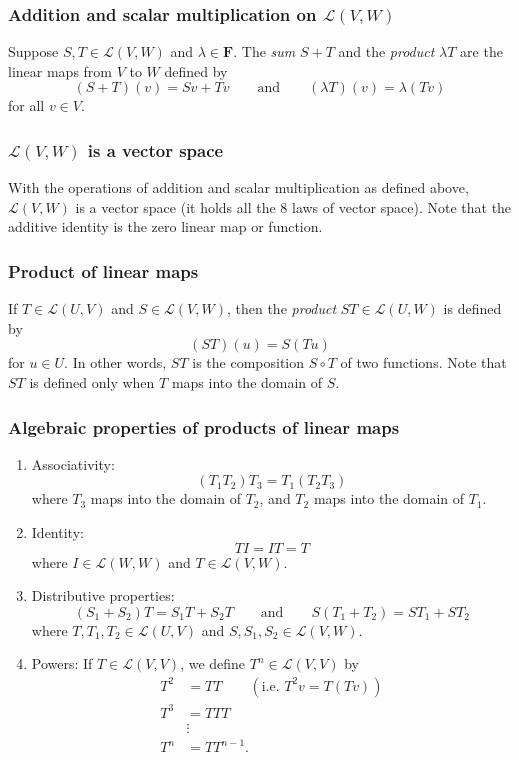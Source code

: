 \documentclass[11pt]{article}
\begin{document}
    \subsubsection{Addition and scalar multiplication on \(\mathcal{L}(V,W)\) }

    Suppose $S,T \in \mathcal{L}(V,W)$ and \(\lambda \in \textbf{F}\). The \emph{sum} \(S + T\) and the \emph{product} \(\lambda T\) are the linear maps from $V$ to $W$ defined by \[(S+T)(v) = Sv + Tv \qquad \text{and} \qquad (\lambda T)(v) = \lambda (Tv)\] for all \(v \in V\).

    \subsubsection{\(\mathcal{L}(V,W)\) is a vector space}

    With the operations of addition and scalar multiplication as defined above, \(\mathcal{L}(V,W)\) is a vector space (it holds all the 8 laws of vector space). Note that the additive identity is the zero linear map or function. 

    \subsubsection{Product of linear maps}

    If \(T \in \mathcal{L}(U,V)\) and \(S \in \mathcal{L}(V,W)\), then the \emph{product} \(ST \in \mathcal{L}(U,W)\) is defined by \[(ST)(u) = S(Tu)\] for \(u \in U\). In other words, $ST$ is the composition \(S \circ T\) of two functions. Note that $ST$ is defined only when $T$ maps into the domain of $S$.

    \subsubsection{Algebraic properties of products of linear maps}

    \begin{enumerate}
        \item Associativity: \[(T_1 T_2)T_3 = T_1 (T_2 T_3)\] where \(T_3\) maps into the domain of \(T_2\), and \(T_2\) maps into the domain of \(T_1\). 
        \item Identity: \[TI = IT = T\] where \(I \in \mathcal{L}(W,W)\) and \(T \in \mathcal{L}(V,W)\). 
        \item Distributive properties: \[(S_1 + S_2)T = S_1 T + S_2 T \qquad \text{and} \qquad S(T_1 + T_2) = ST_1 + ST_2\] where \(T, T_1, T_2 \in \mathcal{L}(U,V)\) and \(S,S_1,S_2 \in \mathcal{L}(V,W)\). 
        \item Powers: If \(T \in \mathcal{L}(V,V)\), we define \(T^n \in \mathcal{L}(V,V)\) by 
        \begin{align*}
            T^2 &= TT \qquad (\text{i.e. } T^2 v = T(Tv))\\
            T^3 &= TTT \\
            &\vdots \\
            T^n &= TT^{n-1}.
        \end{align*}
    \end{enumerate}
\end{document}
